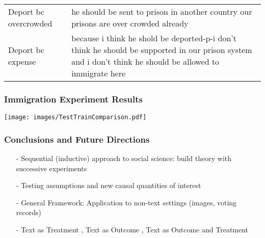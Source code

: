 \documentclass[xcolor=dvipsnames]{beamer}
\begin{document}
\begin{frame}
\begin{table}[ht!]
\begin{tabular}{|p{1.5in}|p{2.75in}|}
Deport bc overcrowded & he should be sent to prison in another country our prisons are over crowded already                                                                                                                                                                                                                                                                                                                                                                                                                                                                                                                                                                       \\
Deport bc expense & because i think he shold be deported-p-i don't think he should be supported in our prison system and i don't think he should be allowed to immigrate here                                                                                                                                                                                                                                                                                                                                                                                                                                                                                                 \\
   \hline
\end{tabular}
\end{table}
\end{frame}

\begin{frame}
\frametitle{Immigration Experiment Results}

\texttt{[image: images/TestTrainComparison.pdf]}

\end{frame}
\begin{frame}
  \frametitle{Conclusions and Future Directions}


  \begin{itemize}
    \item[-] \Large Sequential (inductive) approach to social science: build theory with \alert{successive} experiments \medskip
    \item[-] \Large Testing assumptions and new causal quantities of interest \medskip
    \item[-] \Large General Framework: Application to non-text settings (images, voting records) \medskip
    \item[-] \Large Text as Treatment , Text as Outcome , Text as Outcome \alert{and} Treatment
  \end{itemize}

\end{frame}
\end{document}
